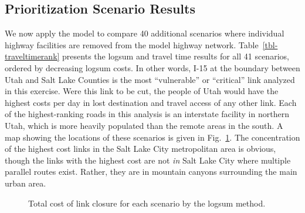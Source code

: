 \documentclass[]{ascelike-new}
\begin{document}
\hypertarget{prioritization-scenario-results}{%
\subsection{Prioritization Scenario
Results}\label{prioritization-scenario-results}}

We now apply the model to compare 40 additional scenarios where
individual highway facilities are removed from the model highway
network. Table~\ref{tbl-traveltimerank} presents the logsum and travel
time results for all 41 scenarios, ordered by decreasing logsum costs.
In other words, I-15 at the boundary between Utah and Salt Lake Counties
is the most ``vulnerable'' or ``critical'' link analyzed in this
exercise. Were this link to be cut, the people of Utah would have the
highest costs per day in lost destination and travel access of any other
link. Each of the highest-ranking roads in this analysis is an
interstate facility in northern Utah, which is more heavily populated
than the remote areas in the south. A map showing the locations of these
scenarios is given in Fig.~\ref{fig-linksmap}. The concentration of the
highest cost links in the Salt Lake City metropolitan area is obvious,
though the links with the highest cost are not \emph{in} Salt Lake City
where multiple parallel routes exist. Rather, they are in mountain
canyons surrounding the main urban area.

\begin{figure}

\begin{minipage}[t]{0.50\linewidth}

{\centering 


}

\end{minipage}%
%
\begin{minipage}[t]{0.50\linewidth}

{\centering 


}

\end{minipage}%

\caption{\label{fig-linksmap}Total cost of link closure for each
scenario by the logsum method.}

\end{figure}
\end{document}
